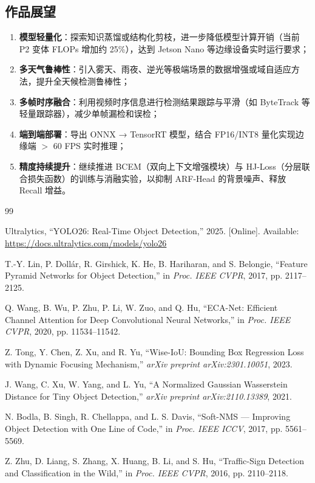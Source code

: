 \documentclass[12pt,a4paper,linespread=1.5,fontset=none]{ctexart}
\begin{document}
\subsection{作品展望}

\begin{enumerate}[label=(\arabic*)]
    \item \textbf{模型轻量化}：探索知识蒸馏或结构化剪枝，进一步降低模型计算开销（当前 P2 变体 FLOPs 增加约 25\%），达到 Jetson Nano 等边缘设备实时运行要求；
    \item \textbf{多天气鲁棒性}：引入雾天、雨夜、逆光等极端场景的数据增强或域自适应方法，提升全天候检测鲁棒性；
    \item \textbf{多帧时序融合}：利用视频时序信息进行检测结果跟踪与平滑（如 ByteTrack 等轻量跟踪器），减少单帧漏检和误检；
    \item \textbf{端到端部署}：导出 ONNX → TensorRT 模型，结合 FP16/INT8 量化实现边缘端 $>$ 60 FPS 实时推理；
    \item \textbf{精度持续提升}：继续推进 BCEM（双向上下文增强模块）与 HJ-Loss（分层联合损失函数）的训练与消融实验，以抑制 ARF-Head 的背景噪声、释放 Recall 增益。
\end{enumerate}

\begin{thebibliography}{99}

Ultralytics,
``YOLO26: Real-Time Object Detection,''
2025. [Online]. Available: \url{https://docs.ultralytics.com/models/yolo26}

T.-Y. Lin, P. Doll\'{a}r, R. Girshick, K. He, B. Hariharan, and S. Belongie,
``Feature Pyramid Networks for Object Detection,''
in \textit{Proc. IEEE CVPR}, 2017, pp. 2117--2125.

Q. Wang, B. Wu, P. Zhu, P. Li, W. Zuo, and Q. Hu,
``ECA-Net: Efficient Channel Attention for Deep Convolutional Neural Networks,''
in \textit{Proc. IEEE CVPR}, 2020, pp. 11534--11542.

Z. Tong, Y. Chen, Z. Xu, and R. Yu,
``Wise-IoU: Bounding Box Regression Loss with Dynamic Focusing Mechanism,''
\textit{arXiv preprint arXiv:2301.10051}, 2023.

J. Wang, C. Xu, W. Yang, and L. Yu,
``A Normalized Gaussian Wasserstein Distance for Tiny Object Detection,''
\textit{arXiv preprint arXiv:2110.13389}, 2021.

N. Bodla, B. Singh, R. Chellappa, and L. S. Davis,
``Soft-NMS --- Improving Object Detection with One Line of Code,''
in \textit{Proc. IEEE ICCV}, 2017, pp. 5561--5569.

Z. Zhu, D. Liang, S. Zhang, X. Huang, B. Li, and S. Hu,
``Traffic-Sign Detection and Classification in the Wild,''
in \textit{Proc. IEEE CVPR}, 2016, pp. 2110--2118.

\end{thebibliography}
\end{document}
